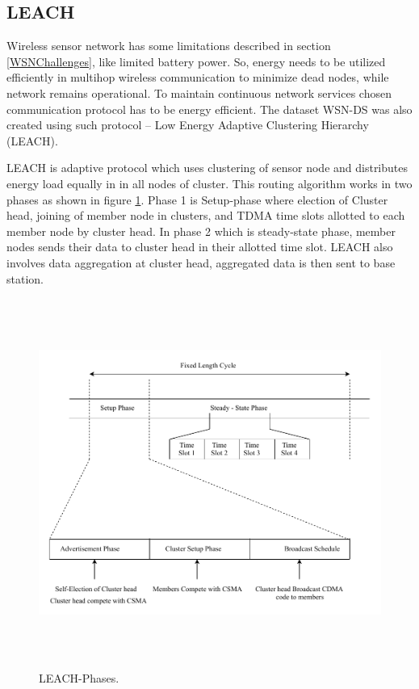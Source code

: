     \subsection{LEACH} \label{SSLeach}
    Wireless sensor network has some limitations described in section \ref{WSNChallenges}, like limited battery power. So, energy needs to be utilized efficiently in multihop wireless communication to minimize dead nodes, while network remains operational. To maintain continuous network services chosen communication protocol has to be energy efficient. The dataset WSN-DS was also created using such protocol – Low Energy Adaptive Clustering Hierarchy (LEACH). 
    \par LEACH \cite{palan2017low} is adaptive protocol which uses clustering of sensor node and distributes energy load equally in in all nodes of cluster. This routing algorithm works in two phases as shown in figure \ref{LeachPhases}. Phase 1 is Setup-phase where election of Cluster head, joining of member node in clusters, and TDMA time slots allotted to each member node by cluster head. In phase 2 which is steady-state phase, member nodes sends their data to cluster head in their allotted time slot. LEACH also involves data aggregation at cluster head, aggregated data is then sent to base station.
    \begin{figure}[htb]
    \center	
    \includegraphics[width=5.5in, height=4.75in] {Figures/PDF/LeachPhases.pdf}
    \caption{LEACH-Phases.}
    \label{LeachPhases}	
    \end{figure}
    
